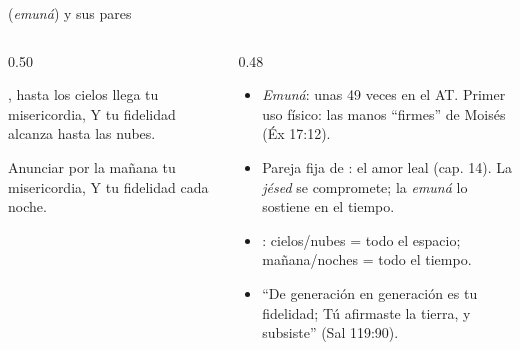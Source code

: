 \begin{frame}{ (\emph{emuná}) y sus pares}
\begin{columns}[t,onlytextwidth]
\begin{column}{0.50\textwidth}
\centering{}
\begin{cita}\SENOR{}, hasta los cielos llega tu misericordia, Y tu fidelidad alcanza hasta las nubes.\end{cita}
\centering{}
\begin{cita}Anunciar por la mañana tu misericordia, Y tu fidelidad cada noche.\end{cita}
\end{column}
\begin{column}{0.48\textwidth}\small
\begin{itemize}
\item \emph{Emuná}: unas 49 veces en el AT. Primer uso físico: las manos ``firmes'' de Moisés (Éx 17:12).
\item Pareja fija de : el amor leal (cap. 14). La \emph{jésed} se compromete; la \emph{emuná} lo sostiene en el tiempo.
\item {}: cielos/nubes = todo el espacio; mañana/noches = todo el tiempo.
\item ``De generación en generación es tu fidelidad; Tú afirmaste la tierra, y subsiste'' (Sal 119:90).
\end{itemize}
\end{column}
\end{columns}
\end{frame}

